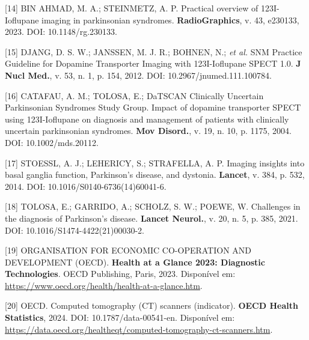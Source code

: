 \documentclass[12pt,a4paper,oneside]{article}
\begin{document}
\begin{singlespace}
\noindent\hangindent=1.25cm\label{ref:datspect-rg}
[14] BIN AHMAD, M. A.; STEINMETZ, A. P. Practical overview of
123I-Ioflupane imaging in parkinsonian syndromes.
\textbf{RadioGraphics}, v. 43, e230133, 2023. DOI:
10.1148/rg.230133.\par\smallskip

\noindent\hangindent=1.25cm\label{ref:datspect-jnm}
[15] DJANG, D. S. W.; JANSSEN, M. J. R.; BOHNEN, N.; \textit{et al.}
SNM Practice Guideline for Dopamine Transporter Imaging with
123I-Ioflupane SPECT 1.0. \textbf{J Nucl Med.}, v. 53, n. 1,
p. 154, 2012. DOI: 10.2967/jnumed.111.100784.\par\smallskip

\noindent\hangindent=1.25cm\label{ref:catafau}
[16] CATAFAU, A. M.; TOLOSA, E.; DaTSCAN Clinically Uncertain
Parkinsonian Syndromes Study Group. Impact of dopamine transporter
SPECT using 123I-Ioflupane on diagnosis and management of patients
with clinically uncertain parkinsonian syndromes.
\textbf{Mov Disord.}, v. 19, n. 10, p. 1175, 2004.
DOI: 10.1002/mds.20112.\par\smallskip

\noindent\hangindent=1.25cm\label{ref:radiographics}
[17] STOESSL, A. J.; LEHERICY, S.; STRAFELLA, A. P. Imaging insights
into basal ganglia function, Parkinson's disease, and dystonia.
\textbf{Lancet}, v. 384, p. 532, 2014. DOI:
10.1016/S0140-6736(14)60041-6.\par\smallskip

\noindent\hangindent=1.25cm\label{ref:tolosa}
[18] TOLOSA, E.; GARRIDO, A.; SCHOLZ, S. W.; POEWE, W. Challenges
in the diagnosis of Parkinson's disease. \textbf{Lancet Neurol.},
v. 20, n. 5, p. 385, 2021. DOI:
10.1016/S1474-4422(21)00030-2.\par\smallskip

\noindent\hangindent=1.25cm\label{ref:oecd-mri}
[19] ORGANISATION FOR ECONOMIC CO-OPERATION AND DEVELOPMENT (OECD).
\textbf{Health at a Glance 2023: Diagnostic Technologies}. OECD
Publishing, Paris, 2023. Disponível em:
\url{https://www.oecd.org/health/health-at-a-glance.htm}.\par\smallskip

\noindent\hangindent=1.25cm\label{ref:oecd-ct}
[20] OECD. Computed tomography (CT) scanners (indicator). \textbf{OECD
Health Statistics}, 2024. DOI: 10.1787/data-00541-en. Disponível em:
\url{https://data.oecd.org/healtheqt/computed-tomography-ct-scanners.htm}.\par\smallskip


\end{singlespace}
\end{document}
